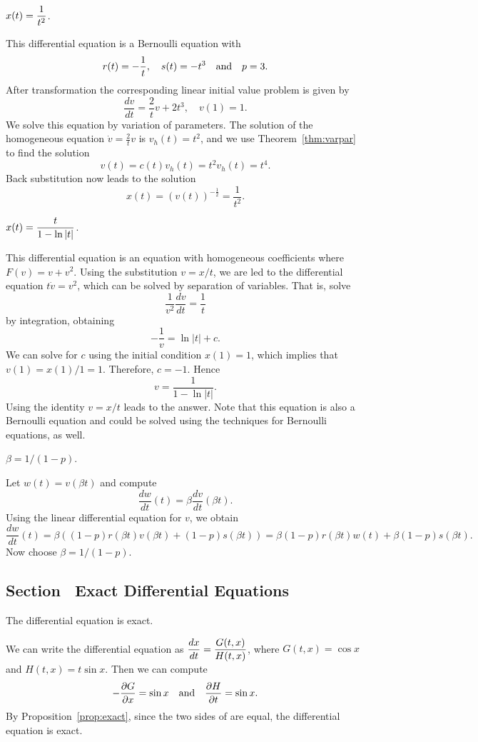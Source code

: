  \ans $x(t) = \displaystyle\frac{1}{t^2}$.

\soln This differential equation is a Bernoulli equation with
\[
r(t) = -\frac{1}{t},\quad s(t) = -t^3 \quad\mbox{and}\quad p=3.
\]
After transformation the corresponding linear initial value problem
is given by
\[
\frac{dv}{dt} = \frac{2}{t} v + 2t^3,\quad v(1)=1.
\]
We solve this equation by variation of parameters.  The solution
of the homogeneous equation $\dot v = \frac{2}{t} v$ is
$v_h(t)=t^2$, and we use Theorem~\ref{thm:varpar} to find the solution
\[
v(t) = c(t) v_h(t) = t^2 v_h(t) = t^4.
\]
Back substitution now leads to the solution
\[
x(t) = (v(t))^{-\frac{1}{2}} = \frac{1}{t^2}.
\]


 \ans $x(t) = \displaystyle\frac{t}{1-\ln|t|}$.

\soln  This differential equation is an equation with homogeneous
coefficients where $F(v) = v + v^2$.  Using the substitution $v=x/t$, we
are led to the differential equation $t\dot{v}=v^2$, which can be solved
by separation of variables.  That is, solve
\[
 \frac{1}{v^2} \frac{dv}{dt} = \frac{1}{t}
\]
by integration, obtaining
\[
-\frac{1}{v} = \ln|t| + c.
\]
We can solve for $c$ using the initial condition $x(1)=1$, which implies
that $v(1)=x(1)/1=1$.  Therefore, $c=-1$.  Hence
\[
v = \frac{1}{1-\ln|t|}.
\]
Using the identity $v=x/t$ leads to the answer.   Note that this equation is
also a Bernoulli equation and could be solved using the techniques for
Bernoulli equations, as well.

 \ans $\beta = 1/(1-p)$.

\soln Let $w(t) = v(\beta t)$ and compute
\[
\frac{dw}{dt}(t) = \beta \frac{dv}{dt}(\beta t).
\]
Using the linear differential equation for $v$, we obtain
\[
\frac{dw}{dt}(t) = \beta ((1-p) r(\beta t) v(\beta t) + (1-p) s(\beta t))
=  \beta (1-p) r(\beta t) w(t) + \beta (1-p) s(\beta t).
\]
Now choose $\beta = 1/(1-p)$.


\subsection*{Section~\protect{\ref{S:exact}} Exact Differential Equations}


 \ans The differential equation is exact.

\soln We can write the differential equation as $\displaystyle\frac{dx}{dt} =
\frac{G(t,x)}{H(t,x)}$, where $G(t,x) = \cos x$ and $H(t,x) = t\sin x$. 
Then we can compute
\[
-\frac{\partial G}{\partial x} = \sin x \quad\mbox{and}\quad
\frac{\partial H}{\partial t} = \sin x.
\]
By Proposition~\ref{prop:exact}, since the
two sides of  are equal, the differential equation is exact.

